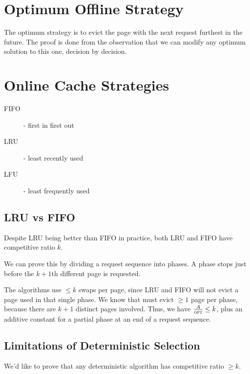            \section{Optimum Offline Strategy} %
            \label{sec:optimum_offline_strategy}
                The optimum strategy is to evict the page with the next request furthest in the future.
                The proof is done from the observation that we can modify any optimum solution to this one, decision by decision.
            \section{Online Cache Strategies} %
            \label{sec:online_cache_strategies}
                \begin{description}
                    \item[FIFO] - first in first out
                    \item[LRU] - least recently used
                    \item[LFU] - least frequently used
                \end{description}
                \subsection{LRU vs FIFO} %
                \label{sub:lru_vs_fifo}
                    Despite LRU being better than FIFO in practice, both LRU and FIFO have competitive ratio $k$.

                    We can prove this by dividing a request sequence into phases.
                    A phase stops just before the $k+1$th different page is requested.

                    The algorithms use $\le k$ swaps per page, since LRU and FIFO will not evict a page used in that single phase.
                    We know that \opt must evict $\ge 1$ page per phase, because there are $k+1$ distinct pages involved.
                    Thus, we have $\frac{A}{\textsc{opt}} \le k$, plus an additive constant for a partial phase at an end of a request sequence.
                \subsection{Limitations of Deterministic Selection} %
                \label{sub:limitations_of_deterministic_selection}
                    We'd like to prove that any deterministic algorithm has competitive ratio $\ge k$.

